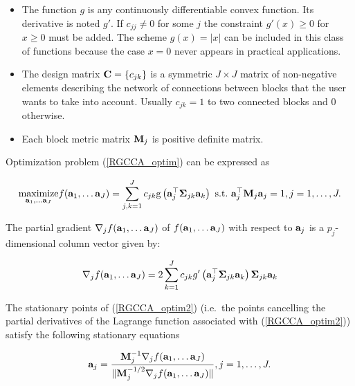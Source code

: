 \documentclass[
]{jss}
\begin{document}
\begin{itemize}
\item The function $g$ is any continuously differentiable convex function. Its 
derivative is noted $g'$. If $c_{jj} \neq 0$ for some $j$ the constraint 
$g'(x)\ge 0$ for $x \geq 0$ must be added. The scheme $g(x) = \vert x \vert$ can 
be included in this class of functions because the case $x=0$ never appears 
in practical applications.

\item The design matrix $\mathbf{C} = \lbrace c_{jk}\rbrace$ is a symmetric 
$J \times J$ matrix of non-negative elements describing the network of 
connections between blocks that the user wants to take into account. 
Usually $c_{jk} = 1$ to two connected blocks and $0$ otherwise.

\item Each block metric matrix $\mathbf{M}_j$ is positive definite matrix.
\end{itemize}

Optimization problem (\ref{RGCCA_optim}) can be expressed as

\begin{equation}
\underset{\mathbf{a}_1, \ldots \mathbf{a}_J}{\text{maximize}} f(\mathbf{a}_1, \ldots \mathbf{a}_J) = \sum_{j,k=1}^J c_{jk} \text{g}\left(\mathbf{a}_j^\top \mathbf{\Sigma}_{jk} \mathbf{a}_k\right) \text{~s.t.~} \mathbf{a}_j^\top \mathbf{M}_j \mathbf{a}_j = 1,  j=1, \ldots, J.
\label{RGCCA_optim2}
\end{equation}

The partial gradient \(\mathbf{\nabla}_j f(\mathbf{a}_1, \ldots \mathbf{a}_J)\) of
\(f(\mathbf{a}_1, \ldots \mathbf{a}_J)\) with respect to \(\mathbf{a} _j\) is a
\(p_j\)-dimensional column vector given by:

\begin{equation}
\mathbf{\nabla}_j f(\mathbf{a}_1, \ldots \mathbf{a}_J)=2\sum_{k=1}^{J}c_{jk}g'\left(\mathbf{a}_j^\top \mathbf{\Sigma}_{jk} \mathbf{a}_k \right) \mathbf{\Sigma}_{jk} \mathbf{a}_k
\label{grad_obj_function}
\end{equation}

The stationary points of (\ref{RGCCA_optim2}) (i.e.~the points
cancelling the partial derivatives of the Lagrange function associated
with (\ref{RGCCA_optim2})) satisfy the following stationary equations

\begin{equation}
\mathbf{a}_j = \frac{\mathbf{M}_j^{-1}\mathbf{\nabla}_j f(\mathbf{a}_1, \ldots \mathbf{a}_J)}{\Vert \mathbf{M}_j^{-1/2}\mathbf{\nabla}_j f(\mathbf{a}_1, \ldots \mathbf{a}_J) \Vert}, j=1, \ldots, J.
\label{RGCCA_StationaryEq}
\end{equation}
\end{document}
